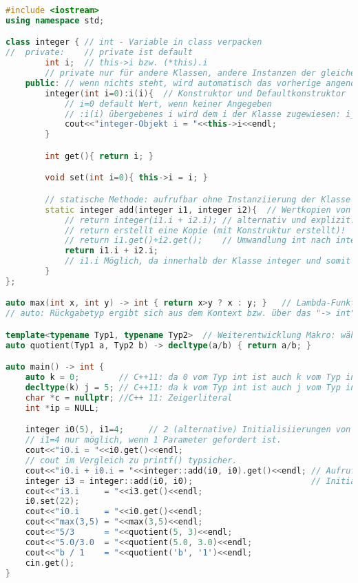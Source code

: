 \begin{lstlisting}[language=C++]
#include <iostream>
using namespace std;

class integer { // int - Variable in class verpacken
//	private:    // private ist default
		int i;  // this->i bzw. (*this).i
		// private nur für andere Klassen, andere Instanzen der gleichen Klasse können drauf zugreifen
	public: // wenn nichts steht, wird automatisch das vorherige angenommen. Hier: private
		integer(int i=0):i(i){  // Konstruktor und Defaultkonstruktor
			// i=0 default Wert, wenn keiner Angegeben
			// :i(i) übergebenes i wird dem i der Klasse zugewiesen: i_1(i_2) i_1 ist this->i, und i_2 ist das übergebene i
			cout<<"integer-Objekt i = "<<this->i<<endl; 
		}

		int get(){ return i; }

		void set(int i=0){ this->i = i; }

		// statische Methode: aufrufbar ohne Instanziierung der Klasse
		static integer add(integer i1, integer i2){  // Wertkopien von i1 und i2
			// return integer(i1.i + i2.i); // alternativ und explizit: Konstruktor-Aufruf
			// return erstellt eine Kopie (mit Konstruktur erstellt)!
			// return i1.get()+i2.get();    // Umwandlung int nach integer, Aufruf Konstruktor implizit
			return i1.i + i2.i;
			// i1.i Möglich, da innerhalb der Klasse integer und somit privates i sichtbar
		}
};

auto max(int x, int y) -> int { return x>y ? x : y; }	// Lambda-Funktion
// auto: Rückgabetyp ergibt sich aus dem Kontext bzw. über das "-> int"

template<typename Typ1, typename Typ2>	// Weiterentwicklung Makro: wählt automatisch Typ aus
auto quotient(Typ1 a, Typ2 b) -> decltype(a/b) { return a/b; }

auto main() -> int {
	auto k = 0;        // C++11: da 0 vom Typ int ist auch k vom Typ int
	decltype(k) j = 5; // C++11: da k vom Typ int ist auch j vom Typ int
	char *c = nullptr; //C++ 11: Zeigerliteral
	int *ip = NULL;

	integer i0(5), i1=4;     // 2 (alternative) Initialisiierungen von Objekten
	// i1=4 nur möglich, wenn 1 Parameter gefordert ist.
	cout<<"i0.i = "<<i0.get()<<endl;
	// cout im Vergleich zu printf() typsicher.
	cout<<"i0.i + i0.i = "<<integer::add(i0, i0).get()<<endl; // Aufruf static-Methode add
	integer i3 = integer::add(i0, i0);                        // Initialisierung von i3
	cout<<"i3.i     = "<<i3.get()<<endl;
	i0.set(22);
	cout<<"i0.i     = "<<i0.get()<<endl;
	cout<<"max(3,5) = "<<max(3,5)<<endl;
	cout<<"5/3      = "<<quotient(5, 3)<<endl;
	cout<<"5.0/3.0  = "<<quotient(5.0, 3.0)<<endl;
	cout<<"b / 1    = "<<quotient('b', '1')<<endl;
	cin.get();
}
\end{lstlisting}

